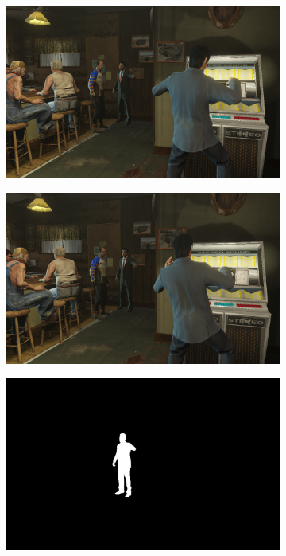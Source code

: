\begin{figure}
\centering
\begin{subfigure}[t]{0.19\textwidth}
\centering
\includegraphics[scale=0.07]{good_examples/visual_69756_img.png}
\end{subfigure}
\begin{subfigure}[t]{0.19\textwidth}
\centering
\includegraphics[scale=0.07]{good_examples/visual_69756_img1.png}
\end{subfigure}
\begin{subfigure}[t]{0.19\textwidth}
\centering
\includegraphics[scale=0.07]{good_examples/visual_69756_gt.png}

\end{subfigure}
\end{figure}
